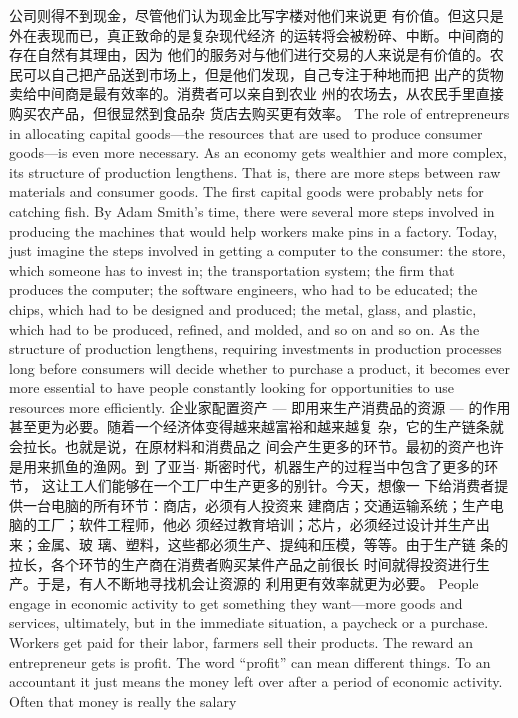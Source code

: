\begin{paracol}{2}
公司则得不到现金，尽管他们认为现金比写字楼对他们来说更
有价值。但这只是外在表现而已，真正致命的是复杂现代经济
的运转将会被粉碎、中断。中间商的存在自然有其理由，因为
他们的服务对与他们进行交易的人来说是有价值的。农民可以自己把产品送到市场上，但是他们发现，自己专注于种地而把
出产的货物卖给中间商是最有效率的。消费者可以亲自到农业
州的农场去，从农民手里直接购买农产品，但很显然到食品杂
货店去购买更有效率。
\switchcolumn*
The role of entrepreneurs in allocating capital goods---the
resources that are used to produce consumer goods---is even
more necessary. As an economy gets wealthier and more complex, its structure of production lengthens. That is, there are
more steps between raw materials and consumer goods. The
first capital goods were probably nets for catching fish. By
Adam Smith's time, there were several more steps involved in
producing the machines that would help workers make pins in
a factory. Today, just imagine the steps involved in getting a
computer to the consumer: the store, which someone has to invest in; the transportation system; the firm that produces the
computer; the software engineers, who had to be educated; the
chips, which had to be designed and produced; the metal, glass,
and plastic, which had to be produced, refined, and molded,
and so on and so on. As the structure of production lengthens,
requiring investments in production processes long before consumers will decide whether to purchase a product, it becomes
ever more essential to have people constantly looking for opportunities to use resources more efficiently.
\switchcolumn
企业家配置资产 --- 即用来生产消费品的资源 --- 的作用
甚至更为必要。随着一个经济体变得越来越富裕和越来越复
杂，它的生产链条就会拉长。也就是说，在原材料和消费品之
间会产生更多的环节。最初的资产也许是用来抓鱼的渔网。到
了亚当$\cdot$ 斯密时代，机器生产的过程当中包含了更多的环节，
这让工人们能够在一个工厂中生产更多的别针。今天，想像一
下给消费者提供一台电脑的所有环节：商店，必须有人投资来
建商店；交通运输系统；生产电脑的工厂；软件工程师，他必
须经过教育培训；芯片，必须经过设计并生产出来；金属、玻
璃、塑料，这些都必须生产、提纯和压模，等等。由于生产链
条的拉长，各个环节的生产商在消费者购买某件产品之前很长
时间就得投资进行生产。于是，有人不断地寻找机会让资源的
利用更有效率就更为必要。
\switchcolumn*
People engage in economic activity to get something they
want---more goods and services, ultimately, but in the immediate situation, a paycheck or a purchase. Workers get paid for
their labor, farmers sell their products. The reward an entrepreneur gets is profit. The word ``profit'' can mean different things.
To an accountant it just means the money left over after a period of economic activity. Often that money is really the salary

\end{paracol}
